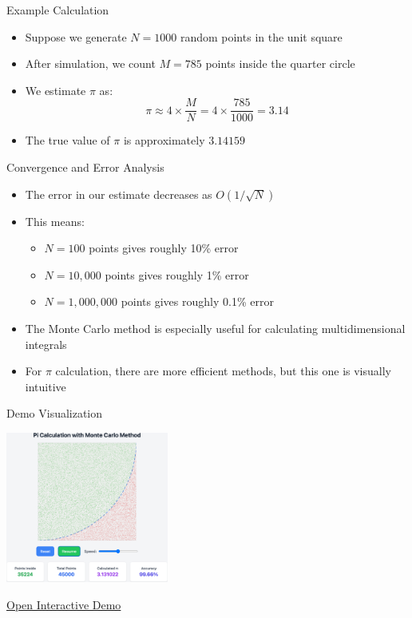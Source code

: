 \begin{frame}{Example Calculation}
  \begin{itemize}
    \item Suppose we generate $N = 1000$ random points in the unit square
    \item After simulation, we count $M = 785$ points inside the quarter circle
    \item We estimate $\pi$ as:
          \[ \pi \approx 4 \times \frac{M}{N} = 4 \times \frac{785}{1000} = 3.14 \]
    \item The true value of $\pi$ is approximately $3.14159$ \parencite{beckmann1971history}
  \end{itemize}
\end{frame}

\begin{frame}{Convergence and Error Analysis}
  \begin{itemize}
    \item The error in our estimate decreases as $O(1/\sqrt{N})$ \parencite{kalos2008monte}
    \item This means:
          \begin{itemize}
            \item $N=100$ points gives roughly 10\% error
            \item $N=10,000$ points gives roughly 1\% error
            \item $N=1,000,000$ points gives roughly 0.1\% error
          \end{itemize}
    \item The Monte Carlo method is especially useful for calculating multidimensional integrals \parencite{MonteCarloCookson2005}
    \item For $\pi$ calculation, there are more efficient methods, but this one is visually intuitive
  \end{itemize}
\end{frame}

\begin{frame}{Demo Visualization}
  \begin{center}
    \includegraphics[width=0.4\textwidth]{./programs/pi_calculation/pi_calculation.png}

    \vspace{0.5cm}
    \href{https://htmlpreview.github.io/?https://github.com/saileshbro/dsa-presentation/blob/main/programs/pi_calculation/index.html}{Open Interactive Demo}
    \end{center}
\end{frame}
